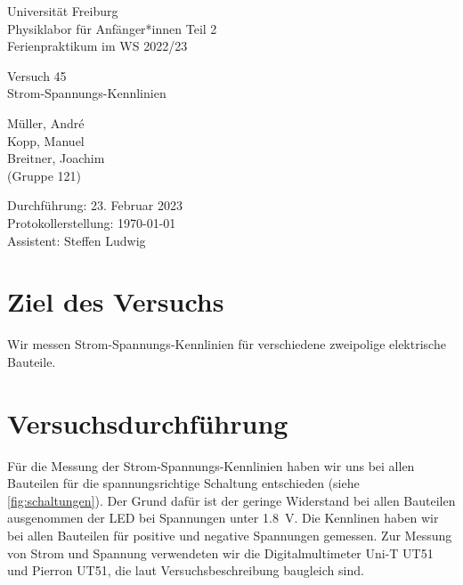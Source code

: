 \documentclass[parskip, 12pt, DIV=16, openany]{scrartcl}
\begin{document}
\begin{center}

\vspace{2cm}

\large
Universität Freiburg \\
Physiklabor für Anfänger*innen Teil 2\\
Ferienpraktikum im WS 2022/23

\vspace{2cm}
\vspace{2cm}
{\sectfont
 \Huge Versuch 45\\Strom-Spannungs-Kennlinien\par
}
\vspace{2cm}

{\Large
Müller, André\\
Kopp, Manuel\\
Breitner, Joachim\\
(Gruppe 121)\\
}

\end{center}
\vspace{2cm}
\vspace{2cm}
\vspace{2cm}
\vspace{2cm}

{\large
Durchführung: 23. Februar 2023\\
Protokollerstellung: \today\\
Assistent: Steffen Ludwig
}

\pagebreak
\section{Ziel des Versuchs}

Wir messen Strom-Spannungs-Kennlinien für verschiedene zweipolige elektrische Bauteile.


\section{Versuchsdurchführung}

Für die Messung der Strom-Spannungs-Kennlinien haben wir uns bei allen Bauteilen für die spannungsrichtige Schaltung entschieden (siehe \cref{fig:schaltungen}). Der Grund dafür ist der geringe Widerstand bei allen Bauteilen ausgenommen der LED bei Spannungen unter \SI{1,8}{\V}. Die Kennlinen haben wir bei allen Bauteilen für positive und negative Spannungen gemessen. Zur Messung von Strom und Spannung verwendeten wir die Digitalmultimeter Uni-T UT51 und Pierron UT51, die laut Versuchsbeschreibung baugleich sind.
\end{document}
